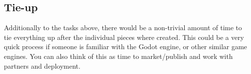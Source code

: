 \documentclass{article}
\begin{document}
\subsection{Tie-up}

Additionally to the tasks above, there would be a non-trivial amount
of time to tie everything up after the individual pieces where
created. This could be a very quick process if someone is familiar
with the Godot engine, or other similar game engines. You can also
think of this as time to market/publish and work with partners and
deployment.
\end{document}
